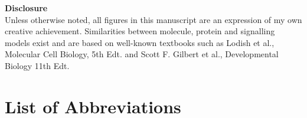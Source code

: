 \documentclass[11pt,singlespacinge,twoside]{reedthesis} %
\begin{document}
  \listoffigures
  \vfill
  \begin{center}
    \textbf{Disclosure}\\
    {Unless otherwise noted, all figures in this manuscript are an expression of my own creative achievement. Similarities between molecule, protein and signalling models exist and are based on well-known textbooks such as Lodish et al., Molecular Cell Biology, 5th Edt. and Scott F. Gilbert et al., Developmental Biology 11th Edt.}
  \end{center}


\mainmatter %
\pagestyle{fancyplain} %

\hypertarget{list-of-abbreviations}{%
\chapter*{List of Abbreviations}\label{list-of-abbreviations}}
\end{document}
